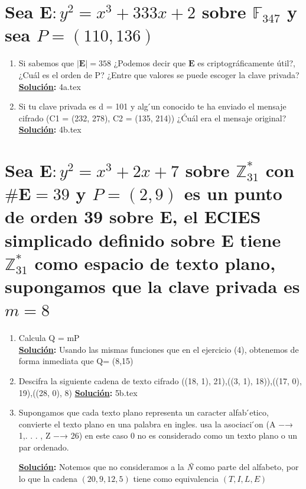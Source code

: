 \documentclass[11pt,letterpaper]{article}
\newcommand{\Z}{\mathbb{Z}}
\newcommand{\sol}{\textbf{\underline{Solución}: }} %
\begin{document}
\section{Sea $\mathbf{E} : y^2 = x^3 + 333x + 2$ sobre $\mathbb{F}_{347}$ y sea $P=(110, 136)$}
\begin{enumerate}[label=\alph*)]
    \item Si sabemos que $|\mathbf{E}| = 358$ ¿Podemos decir que $\mathbf{E}$ es criptográficamente útil?, ¿Cuál es el orden de P? ¿Entre que valores se puede escoger la clave privada?
        \sol {4a.tex}
    
    \item Si tu clave privada es d = 101 y alg ́un conocido te ha enviado el mensaje cifrado (C1 = (232, 278), C2 = (135, 214)) ¿Ćuál era el mensaje original?\\
        \sol {4b.tex}
\end{enumerate}



\section{Sea $\mathbf{E} : y^2 = x^3 + 2x + 7$ sobre $\Z^*_{31}$ con $\# \mathbf{E} = 39$
y $P =(2,9)$ es un punto de orden 39 sobre $\mathbf{E}$, el ECIES simplicado definido sobre
$\mathbf{E}$ tiene $\Z^*_{31}$ como espacio de texto plano, supongamos que la clave privada es $m=8$}

\begin{enumerate}[label=\alph*)]
    \item Calcula Q = mP\\
        \sol
        Usando las mismas funciones que en el ejercicio (4), obtenemos de forma inmediata que Q= (8,15)
        
    \item Descifra la siguiente cadena de texto cifrado ((18, 1), 21),((3, 1), 18)),((17, 0), 19),((28, 0), 8)
        \sol
        {5b.tex}
    \item Supongamos que cada texto plano representa un caracter alfab ́etico, convierte el texto plano en una palabra en ingles. usa la asociaci ́on (A −→ 1,. . . , Z −→ 26) en este caso 0 no es considerado como un texto plano o un par ordenado.
        
        \sol Notemos que no consideramos a la \textit{Ñ} como parte del alfabeto, por lo que la cadena $(20, 9, 12, 5)$ tiene como equivalencia $(T, I, L, E)$
\end{enumerate}
\end{document}
